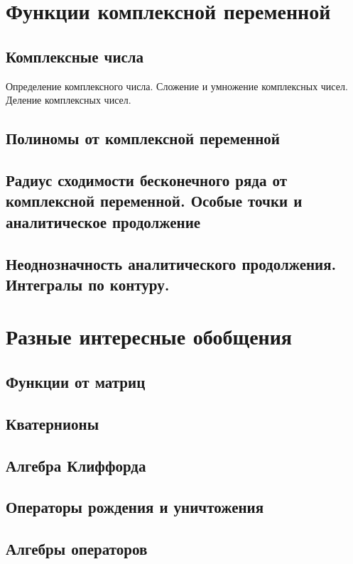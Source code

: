 \documentclass{article}
\begin{document}
\section{Функции комплексной переменной}
\subsection{Комплексные числа}
Определение комплексного числа. Сложение и умножение комплексных чисел. Деление комплексных чисел.
\subsection{Полиномы от комплексной переменной}
\subsection{Радиус сходимости бесконечного ряда от комплексной переменной. Особые точки и аналитическое продолжение}
\subsection{Неоднозначность аналитического продолжения. Интегралы по контуру.}

\section{Разные интересные обобщения}
\subsection{Функции от матриц}
\subsection{Кватернионы}
\subsection{Алгебра Клиффорда}
\subsection{Операторы рождения и уничтожения}
\subsection{Алгебры операторов}
\end{document}
